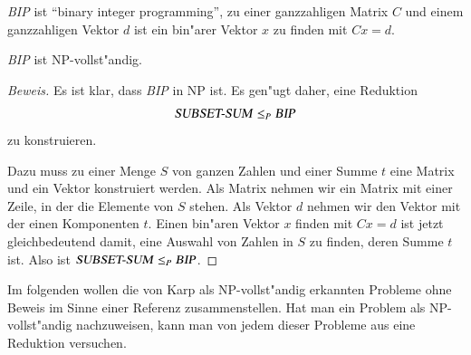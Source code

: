 \textsl{BIP} ist ``binary integer programming'', zu einer ganzzahligen
Matrix $C$ und einem ganzzahligen Vektor $d$ ist ein bin"arer
Vektor $x$ zu finden mit $Cx=d$.

\begin{satz}
\textsl{BIP} ist NP-vollst"andig.
\end{satz}

\begin{proof}[Beweis]
Es ist klar, dass \textsl{BIP} in NP ist. Es gen"ugt daher, eine
Reduktion
\[
\text{\textsl{SUBSET-SUM}}\le_P\text{\textsl{BIP}}
\]
zu konstruieren.

Dazu muss zu einer Menge $S$ von ganzen Zahlen und einer Summe $t$
eine Matrix und ein Vektor konstruiert werden. Als Matrix nehmen wir
ein Matrix mit einer Zeile, in der die Elemente von $S$ stehen. Als
Vektor $d$ nehmen wir den Vektor mit der einen Komponenten $t$.
Einen bin"aren Vektor $x$ finden mit $Cx=d$ ist jetzt gleichbedeutend
damit, eine Auswahl von Zahlen in $S$ zu finden, deren Summe $t$ ist.
Also ist
$\text{\textsl{SUBSET-SUM}}\le_P\text{\textsl{BIP}}$.
\end{proof}

Im folgenden wollen die von Karp als NP-vollst"andig erkannten Probleme
ohne Beweis im Sinne einer Referenz zusammenstellen. Hat man ein
Problem als NP-vollst"andig nachzuweisen, kann man von jedem dieser
Probleme aus eine Reduktion versuchen.

